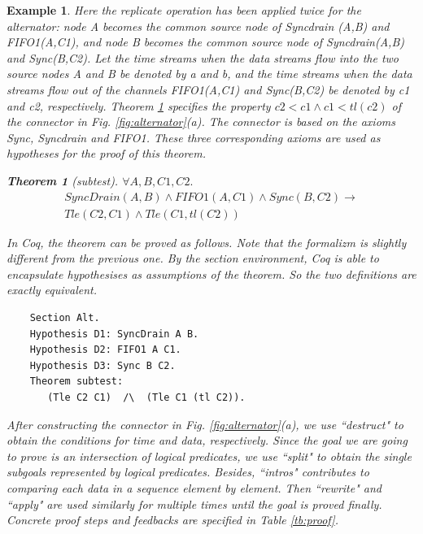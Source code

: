 \documentclass[3p,times]{elsarticle}
\newtheorem{example}{Example}[section]
\newtheorem{theorem}{Theorem}[section]
\begin{document}
\begin{example}
Here the replicate operation has been applied twice for the alternator: node \emph{A} becomes the common source node of \emph{Syncdrain (A,B)} and \emph{FIFO1(A,C1)}, and node \emph{B} becomes the common source node of \emph{Syncdrain(A,B)} and \emph{Sync(B,C2)}. Let the time streams when the
data streams flow into the two source nodes \emph{A} and \emph{B} be denoted by \emph{a} and \emph{b}, and the time streams when the data streams
flow out of the channels \emph{FIFO1(A,C1)} and \emph{Sync(B,C2)} be denoted by \emph{c1} and \emph{c2}, respectively. Theorem \ref{the:alternator}
specifies the property $c2<c1 \wedge c1<tl (c2)$ of the connector in Fig. \ref{fig:alternator}(a). The connector is based on the axioms
Sync, Syncdrain and FIFO1. These three corresponding axioms are used as hypotheses for the proof of this theorem.
\begin{theorem}[subtest]\label{the:alternator}
$\forall A,B,C1,C2.$
\begin{eqnarray*}
  & SyncDrain(A,B)\land FIFO1(A,C1)\land Sync(B,C2)  \rightarrow & \\
  & Tle(C2,C1) \wedge Tle(C1, tl(C2))
\end{eqnarray*}
\end{theorem}
In Coq, the theorem can be proved as follows. Note that the formalizm is slightly different from the previous one. By the \emph{section} environment, Coq is able to encapsulate hypothesises as assumptions of the theorem. So the two definitions are exactly equivalent.

\begin{verbatim}
    Section Alt.
    Hypothesis D1: SyncDrain A B.
    Hypothesis D2: FIFO1 A C1.
    Hypothesis D3: Sync B C2.
    Theorem subtest:
       (Tle C2 C1)  /\  (Tle C1 (tl C2)).
\end{verbatim}

After constructing the connector in Fig. \ref{fig:alternator}(a), we use ``destruct" to obtain the conditions for time and data, respectively.
Since the goal we are going to prove is an intersection of logical predicates, we use ``split" to obtain the single subgoals represented by
logical predicates. Besides, ``intros" contributes to comparing each data in a sequence element by element. Then ``rewrite" and ``apply" are
used similarly for multiple times until the goal is proved finally. %
Concrete proof steps and feedbacks are specified in Table \ref{tb:proof}.


\end{example}
\end{document}

